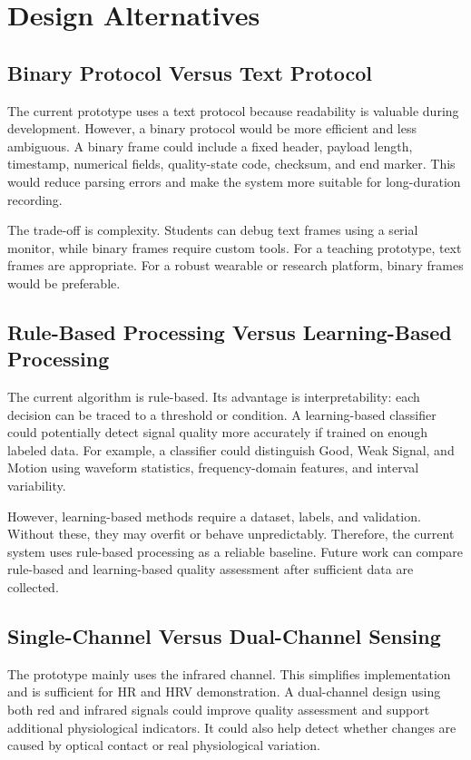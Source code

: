 \documentclass[10pt,conference]{IEEEtran}
\begin{document}
\section{Design Alternatives}
\subsection{Binary Protocol Versus Text Protocol}
The current prototype uses a text protocol because readability is valuable during development. However, a binary protocol would be more efficient and less ambiguous. A binary frame could include a fixed header, payload length, timestamp, numerical fields, quality-state code, checksum, and end marker. This would reduce parsing errors and make the system more suitable for long-duration recording.

The trade-off is complexity. Students can debug text frames using a serial monitor, while binary frames require custom tools. For a teaching prototype, text frames are appropriate. For a robust wearable or research platform, binary frames would be preferable.

\subsection{Rule-Based Processing Versus Learning-Based Processing}
The current algorithm is rule-based. Its advantage is interpretability: each decision can be traced to a threshold or condition. A learning-based classifier could potentially detect signal quality more accurately if trained on enough labeled data. For example, a classifier could distinguish Good, Weak Signal, and Motion using waveform statistics, frequency-domain features, and interval variability.

However, learning-based methods require a dataset, labels, and validation. Without these, they may overfit or behave unpredictably. Therefore, the current system uses rule-based processing as a reliable baseline. Future work can compare rule-based and learning-based quality assessment after sufficient data are collected.

\subsection{Single-Channel Versus Dual-Channel Sensing}
The prototype mainly uses the infrared channel. This simplifies implementation and is sufficient for HR and HRV demonstration. A dual-channel design using both red and infrared signals could improve quality assessment and support additional physiological indicators. It could also help detect whether changes are caused by optical contact or real physiological variation.
\end{document}

